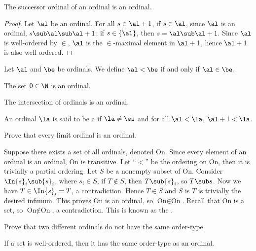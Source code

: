 \documentclass[10pt]{article}
\begin{document}
\begin{proposition}
    The successor ordinal of an ordinal is an ordinal.
\end{proposition}
\begin{proof}
    Let $\al$ be an ordinal. For all $s\in\al+1$, if $s\in\al$, since $\al$ is an ordinal, $s\sub\al\sub\al+1$; if $s\in\{\al\}$, then $s=\al\sub\al+1$. Since $\al$ is well-ordered by $\in$, $\al$ is the $\in$-maximal element in $\al+1$, hence $\al+1$ is also well-ordered.
\end{proof}
\par
Let $\al$ and $\be$ be ordinals. We define $\al<\be$ if and only if $\al\in\be$.
\begin{example}
    The set $0\in\N$ is an ordinal.
\end{example}
\begin{problem}
    The intersection of ordinals is an ordinal.
\end{problem}
\begin{definition}
    An ordinal $\la$ is said to be a  if $\la\ne\es$ and for all $\al<\la$, $\al+1<\la$.
\end{definition}
\begin{problem}
    Prove that every limit ordinal is an ordinal.
\end{problem}
\par
Suppose there exists a set of all ordinals, denoted $\text{On}$. Since every element of an ordinal is an ordinal, $\text{On}$ is transitive. Let ``$<$'' be the ordering on $\text{On}$, then it is trivially a partial ordering. Let $S$ be a nonempty subset of $\text{On}$. Consider $\In{s}_{i}\sub{s}_{i}$, where ${s}_{i}\in S$, if $T\notin S$, then $T\sub{s}_{i}$, so $T\sub s$. Now we have $T\in\In{s}_{i}=T$, a contradiction. Hence $T\in S$ and $S$ is $T$ is trivially the desired infimum. This proves $\text{On}$ is an ordinal, so $\text{On}\in\text{On}$. Recall that $\text{On}$ is a set, so $\text{On}\notin\text{On}$, a contradiction. This is known as the .
\begin{problem}
    Prove that two different ordinals do not have the same order-type.
\end{problem}
\begin{proposition}
    If a set is well-ordered, then it has the same order-type as an ordinal.
\end{proposition}
\end{document}
